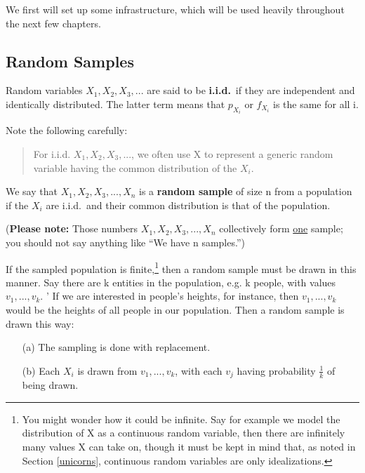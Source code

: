 We first will set up some infrastructure, which will be used heavily
throughout the next few chapters.

\subsection{Random Samples}
\label{randomsamples}

\begin{definition}
Random variables $X_1, X_2, X_3,...$ are said to be
{\bf i.i.d.}\ if they are independent and identically distributed.  The
latter term means that $p_{X_i}$ or $f_{X_i}$ is the same for all i.
\end{definition}

Note the following carefully:

\begin{quote}
For i.i.d. $X_1, X_2, X_3,...$, we often use X to represent a generic
random variable having the common distribution of the $X_i$.
\end{quote}

\begin{definition}
We say that $X_1, X_2, X_3,...,X_n$ is a {\bf random
sample} of size n from a population if the $X_i$ are i.i.d.\ and their 
common distribution is that of the population.
\end{definition}

({\bf Please note:}  Those numbers $X_1, X_2, X_3,...,X_n$ collectively
form \underline{one} sample; you should not say anything like ``We have
n samples.'')

If the sampled population is finite,\footnote{You might wonder how it
could be infinite.  Say for example we model the distribution of X as a
continuous random variable, then there are infinitely many values X can
take on, though it must be kept in mind that, as noted in Section
\ref{unicorns}, continuous random variables are only idealizations.}
then a random sample must be drawn in this manner.  Say there are k
entities in the population, e.g. k people, with values $v_1,...,v_k$.  '
If we are interested in people's heights, for instance, then
$v_1,...,v_k$ would be the heights of all people in our population.
Then a random sample is drawn this way:

\begin{itemize}

\item [(a)] The sampling is done with replacement.

\item [(b)] Each $X_i$ is drawn from $v_1,...,v_k$, with each $v_j$
having probability $\frac{1}{k}$ of being drawn.

\end{itemize}

